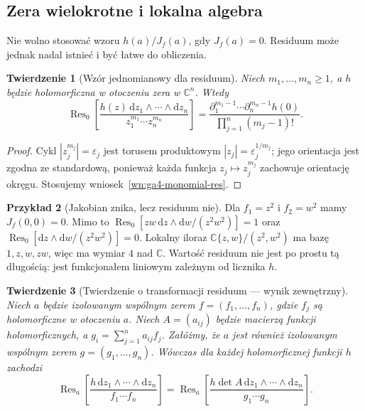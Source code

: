 \documentclass[11pt,a4paper,openany]{report}
\numberwithin{equation}{section}
\theoremstyle{plain}
\newtheorem{twierdzenie}{Twierdzenie}[section]
\theoremstyle{definition}
\newtheorem{przyklad}[twierdzenie]{Przykład}
\theoremstyle{remark}
\newcommand{\C}{\mathbb C}
\begin{document}
\subsection{Zera wielokrotne i lokalna algebra}
\label{subsec:ga4-res-multiple}

Nie wolno stosować wzoru $h(a)/J_f(a)$, gdy $J_f(a)=0$.
Residuum może jednak nadal istnieć i być łatwe do obliczenia.

\begin{twierdzenie}[Wzór jednomianowy dla residuum]
\label{tw:ga4-res-monomial}
Niech $m_1,\ldots,m_n\ge1$, a $h$ będzie holomorficzna
w otoczeniu zera w $\C^n$. Wtedy
\[
\operatorname{Res}_0\!\left[
\frac{h(z)\,\mathrm dz_1\wedge\cdots\wedge\mathrm dz_n}
{z_1^{m_1}\cdots z_n^{m_n}}\right]
=\frac{\partial_1^{m_1-1}\cdots\partial_n^{m_n-1}h(0)}
{\prod_{j=1}^n(m_j-1)!}.
\]
\end{twierdzenie}
\begin{proof}
Cykl $|z_j^{m_j}|=\varepsilon_j$ jest torusem produktowym
$|z_j|=\varepsilon_j^{1/m_j}$; jego orientacja jest
zgodna ze standardową, ponieważ każda funkcja
$z_j\mapsto z_j^{m_j}$ zachowuje orientację okręgu.
Stosujemy wniosek~\ref{wn:ga4-monomial-res}.
\end{proof}

\begin{przyklad}[Jakobian znika, lecz residuum nie]
Dla $f_1=z^2$ i $f_2=w^2$ mamy $J_f(0,0)=0$.
Mimo to $\operatorname{Res}_0[zw\,\mathrm dz\wedge\mathrm dw/
(z^2w^2)]=1$ oraz
$\operatorname{Res}_0[\mathrm dz\wedge\mathrm dw/(z^2w^2)]=0$.
Lokalny iloraz $\C\{z,w\}/(z^2,w^2)$ ma bazę
$1,z,w,zw$, więc ma wymiar $4$ nad $\C$.
Wartość residuum nie jest po prostu tą długością:
jest funkcjonałem liniowym zależnym od licznika $h$.
\end{przyklad}

\begin{twierdzenie}[Twierdzenie o transformacji residuum — wynik zewnętrzny]
\label{tw:ga4-res-transform}
Niech $a$ będzie izolowanym wspólnym zerem
$f=(f_1,\ldots,f_n)$, gdzie $f_j$ są holomorficzne
w otoczeniu $a$. Niech $A=(a_{ij})$ będzie macierzą
funkcji holomorficznych, a $g_i=\sum_{j=1}^n a_{ij}f_j$.
Załóżmy, że $a$ jest również izolowanym wspólnym zerem
$g=(g_1,\ldots,g_n)$. Wówczas dla każdej holomorficznej
funkcji $h$ zachodzi
\[
\operatorname{Res}_a\!\left[
\frac{h\,\mathrm dz_1\wedge\cdots\wedge\mathrm dz_n}
{f_1\cdots f_n}\right]
=\operatorname{Res}_a\!\left[
\frac{h\det A\,\mathrm dz_1\wedge\cdots\wedge\mathrm dz_n}
{g_1\cdots g_n}\right].
\]
\end{twierdzenie}
\end{document}
